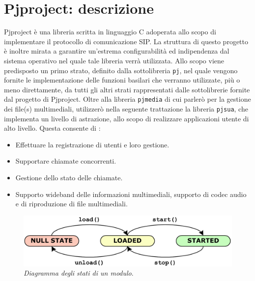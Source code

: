 \section{Pjproject: descrizione}
Pjproject è una libreria scritta in linguaggio C adoperata allo
scopo di implementare il protocollo di comunicazione SIP. La struttura di 
questo progetto è inoltre mirata a garantire un'estrema configurabilità ed 
indipendenza dal sistema operativo nel quale tale libreria verrà utilizzata.
Allo scopo viene predisposto un primo strato, definito dalla sottolibreria \texttt{\small pj},
nel quale vengono fornite le implementazione delle funzioni basilari che verranno
utilizzate, più o meno direttamente, da tutti gli altri strati rappresentati dalle
sottolibrerie fornite dal progetto di Pjproject. Oltre alla libreria \texttt{\small pjmedia}
di cui parlerò per la gestione dei file(s) multimediali, utilizzerò nella seguente
trattazione la libreria \texttt{\small pjsua}, che implementa un livello di
astrazione, allo scopo di 
realizzare applicazioni utente di alto livello. Questa consente di \parencite{man:pjsip}:
\begin{itemize}
\item Effettuare la registrazione di utenti e loro gestione.
\item Supportare chiamate concorrenti.
\item Gestione dello stato delle chiamate.
\item Supporto wideband delle informazioni multimediali, supporto di codec audio
	e di riproduzione di file multimediali.
\end{itemize}

\begin{figure}[thp]
\centering
\includegraphics[scale=0.3]{img/libraries/modulestatepjsip.png}
\caption{\textit{Diagramma degli stati di un modulo}.\parencite{man:pjsip}}
\label{fig:pjprojectmod}
\end{figure}

